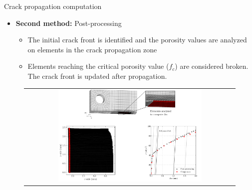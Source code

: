 \documentclass[9pt]{beamer}
\begin{document}
\begin{frame}{Crack propagation computation}

\begin{itemize}
	\item \textbf{Second method:} Post-processing
	\vspace{0.15cm}
	\begin{itemize}
	\item The initial crack front is identified and the porosity values are analyzed on elements in the crack propagation zone
	\vspace{0.15cm}
	\item Elements reaching the critical porosity value ($f_c$) are considered broken. The crack front is updated after propagation.
	\end{itemize}
\end{itemize}

\vspace{0.15cm}

\begin{figure}
        \begin{tabular}{c}
            \includegraphics[width=0.7\textwidth]{Images/post_processing_technique.pdf} \\
        \end{tabular}
    \end{figure}

\end{frame}

\end{document}
